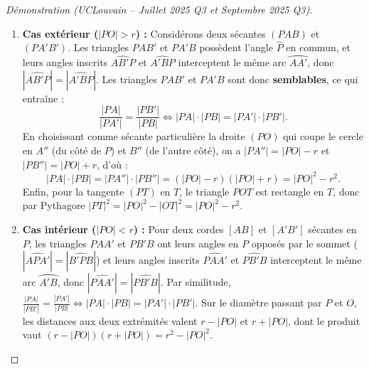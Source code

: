 \begin{proof}[Démonstration (UCLouvain -- Juillet 2025 Q3 et Septembre 2025 Q3)]
\mbox{}
\begin{enumerate}
    \item \textbf{Cas extérieur ($|PO| > r$) :} Considérons deux sécantes $(PAB)$ et $(PA'B')$. Les triangles $PAB'$ et $PA'B$ possèdent l'angle $\widehat{P}$ en commun, et leurs angles inscrits $\widehat{AB'P}$ et $\widehat{A'BP}$ interceptent le même arc $\wideparen{AA'}$, donc $|\widehat{AB'P}| = |\widehat{A'BP}|$. Les triangles $PAB'$ et $PA'B$ sont donc \textbf{semblables}, ce qui entraîne :
    \[
        \frac{|PA|}{|PA'|} = \frac{|PB'|}{|PB|} \iff |PA| \cdot |PB| = |PA'| \cdot |PB'|.
    \]
    En choisissant comme sécante particulière la droite $(PO)$ qui coupe le cercle en $A''$ (du côté de $P$) et $B''$ (de l'autre côté), on a $|PA''| = |PO| - r$ et $|PB''| = |PO| + r$, d'où :
    \[
        |PA| \cdot |PB| = |PA''| \cdot |PB''| = (|PO| - r)(|PO| + r) = |PO|^2 - r^2.
    \]
    Enfin, pour la tangente $(PT)$ en $T$, le triangle $POT$ est rectangle en $T$, donc par Pythagore $|PT|^2 = |PO|^2 - |OT|^2 = |PO|^2 - r^2$.
    \item \textbf{Cas intérieur ($|PO| < r$) :} Pour deux cordes $[AB]$ et $[A'B']$ sécantes en $P$, les triangles $PAA'$ et $PB'B$ ont leurs angles en $P$ opposés par le sommet ($|\widehat{APA'}| = |\widehat{B'PB}|$) et leurs angles inscrits $\widehat{PAA'}$ et $\widehat{PB'B}$ interceptent le même arc $\wideparen{A'B}$, donc $|\widehat{PAA'}| = |\widehat{PB'B}|$. Par similitude, $\frac{|PA|}{|PB'|} = \frac{|PA'|}{|PB|} \iff |PA|\cdot|PB| = |PA'|\cdot|PB'|$. Sur le diamètre passant par $P$ et $O$, les distances aux deux extrémités valent $r - |PO|$ et $r + |PO|$, dont le produit vaut $(r - |PO|)(r + |PO|) = r^2 - |PO|^2$.
\end{enumerate}
\end{proof}

